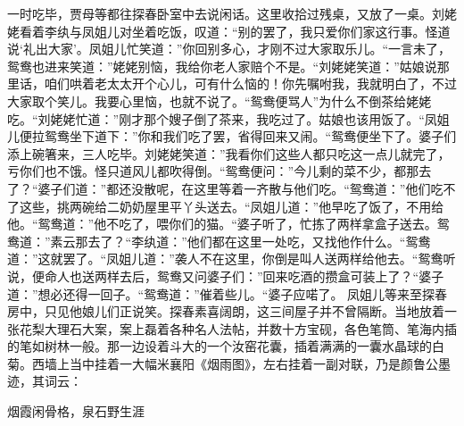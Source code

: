 \documentclass[12pt,oneside]{book}
\begin{document}
一时吃毕，贾母等都往探春卧室中去说闲话。这里收拾过残桌，又放了一桌。刘姥姥看着李纨与凤姐儿对坐着吃饭，叹道：“别的罢了，我只爱你们家这行事。怪道说‘礼出大家’。凤姐儿忙笑道：”你回别多心，才刚不过大家取乐儿。“一言未了，鸳鸯也进来笑道：”姥姥别恼，我给你老人家赔个不是。“刘姥姥笑道：”姑娘说那里话，咱们哄着老太太开个心儿，可有什么恼的！你先嘱咐我，我就明白了，不过大家取个笑儿。我要心里恼，也就不说了。“鸳鸯便骂人”为什么不倒茶给姥姥吃。“刘姥姥忙道：”刚才那个嫂子倒了茶来，我吃过了。姑娘也该用饭了。“凤姐儿便拉鸳鸯坐下道下：”你和我们吃了罢，省得回来又闹。“鸳鸯便坐下了。婆子们添上碗箸来，三人吃毕。刘姥姥笑道：”我看你们这些人都只吃这一点儿就完了，亏你们也不饿。怪只道风儿都吹得倒。“鸳鸯便问：”今儿剩的菜不少，都那去了？“婆子们道：”都还没散呢，在这里等着一齐散与他们吃。“鸳鸯道：”他们吃不了这些，挑两碗给二奶奶屋里平丫头送去。“凤姐儿道：”他早吃了饭了，不用给他。“鸳鸯道：”他不吃了，喂你们的猫。“婆子听了，忙拣了两样拿盒子送去。鸳鸯道：”素云那去了？“李纨道：”他们都在这里一处吃，又找他作什么。“鸳鸯道：”这就罢了。“凤姐儿道：”袭人不在这里，你倒是叫人送两样给他去。“鸳鸯听说，便命人也送两样去后，鸳鸯又问婆子们：”回来吃酒的攒盒可装上了？“婆子道：”想必还得一回子。“鸳鸯道：”催着些儿。“婆子应喏了。
凤姐儿等来至探春房中，只见他娘儿们正说笑。探春素喜阔朗，这三间屋子并不曾隔断。当地放着一张花梨大理石大案，案上磊着各种名人法帖，并数十方宝砚，各色笔筒、笔海内插的笔如树林一般。那一边设着斗大的一个汝窑花囊，插着满满的一囊水晶球的白菊。西墙上当中挂着一大幅米襄阳《烟雨图》，左右挂着一副对联，乃是颜鲁公墨迹，其词云：

烟霞闲骨格，泉石野生涯
\end{document}

